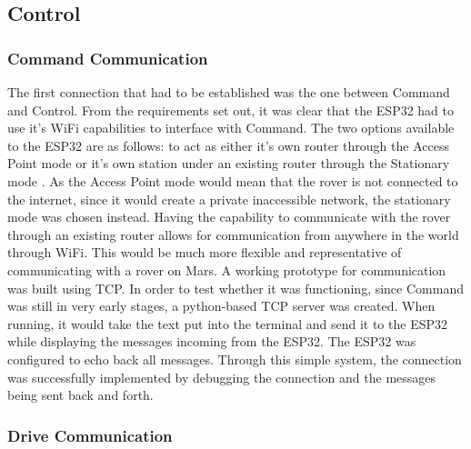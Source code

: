\documentclass[a4paper]{article}
\begin{document}
\subsection{Control} 

\subsubsection{Command Communication}

The first connection that had to be established was the one between Command 
and Control. From the requirements set out, it was clear that the ESP32 
had to use it’s WiFi capabilities to interface with Command. The two 
options available to the ESP32 are as follows: to act as either it's own 
router through the Access Point mode or it's own station under an existing 
router through the Stationary mode \cite{ESPWIFI}. As the Access Point mode 
would mean that the rover is not connected to the internet, since 
it would create a private inaccessible network, the stationary mode was chosen 
instead. Having the capability to communicate with the rover through an 
existing router allows for communication from anywhere in the world 
through WiFi. This would be much more flexible and representative of 
communicating with a rover on Mars. A working prototype for communication 
was built using TCP. In order to test whether it was functioning, since 
Command was still in very early stages, a python-based TCP server was created. 
When running, it would take the text put into the terminal and send it 
to the ESP32 while displaying the messages incoming from the ESP32. 
The ESP32 was configured to echo back all messages. Through this 
simple system, the connection was successfully implemented by debugging
 the connection and the messages being sent back and forth.

\subsubsection{Drive Communication}
\end{document}
